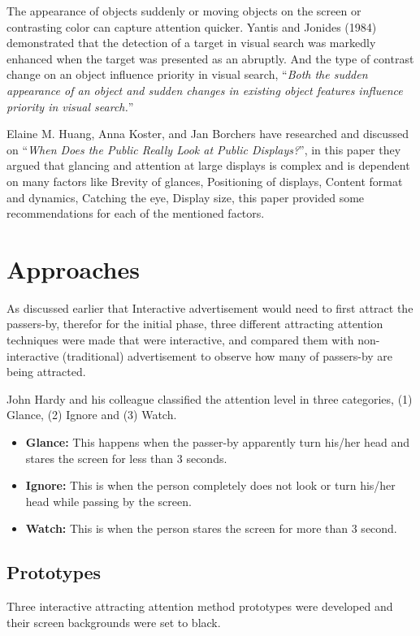 The appearance of objects suddenly or moving objects on the screen or contrasting color can capture attention quicker. Yantis and Jonides (1984) demonstrated that the detection of a target in visual search was markedly enhanced when the target was presented as an abruptly\cite{capturingattention}. And the type of contrast change on an object influence priority in visual search, ``\emph{Both the sudden appearance of an object and sudden changes in existing object features influence priority in visual search.}''\cite{Luminance}

Elaine M. Huang, Anna Koster, and Jan Borchers have researched and discussed on ``\emph{When Does the Public Really Look at Public Displays?}''\cite{WhenPublicDisplays}, in this paper they argued that glancing and attention at large displays is complex and is dependent on many factors like Brevity of glances, Positioning of displays, Content format and dynamics, Catching the eye, Display size, this paper provided some recommendations for each of the mentioned factors.

\section{Approaches}
As discussed earlier that Interactive advertisement would need to first attract the passers-by, therefor for the initial phase, three different attracting attention techniques were made that were interactive, and compared them with non-interactive (traditional) advertisement to observe how many of passers-by are being attracted.

John Hardy and his colleague classified the attention level in three categories, (1) Glance, (2) Ignore and (3) Watch. 

\begin{itemize}
\item \textbf{Glance: } This happens when the passer-by apparently turn his/her head and stares the screen for less than 3 seconds.
\item \textbf{Ignore: } This is when the person completely does not look or turn his/her head while passing by the screen.
\item \textbf{Watch: } This is when the person stares the screen for more than 3 second.
\end{itemize}


\subsection{Prototypes}
Three interactive attracting attention method prototypes were developed and their screen backgrounds were set to black.
 
